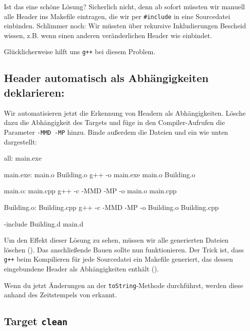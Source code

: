 Ist das eine schöne Lösung?
Sicherlich nicht, denn ab sofort müssten wir manuell alle Header ins Makefile eintragen, die wir per \lstinline{#include} in eine Sourcedatei einbinden.
Schlimmer noch: Wir müssten über rekursive Inkludierungen Bescheid wissen, z.B. wenn  einen anderen veränderlichen Header wie  einbindet.

Glücklicherweise hilft uns \texttt{g++} bei diesem Problem.

\subsection{Header automatisch als Abhängigkeiten deklarieren:}

Wir automatisieren jetzt die Erkennung von Headern als Abhängigkeiten.
Lösche dazu die Abhängigkeit  des Targets  und füge in den Compiler-Aufrufen die Parameter \texttt{-MMD -MP} hinzu.
Binde außerdem die Dateien  und  ein wie unten dargestellt:
\begin{lstmake}
all: main.exe

main.exe: main.o Building.o
    g++ -o main.exe main.o Building.o

main.o: main.cpp
    g++ -c -MMD -MP -o main.o main.cpp

Building.o: Building.cpp
    g++ -c -MMD -MP -o Building.o Building.cpp

-include Building.d main.d
\end{lstmake}

Um den Effekt dieser Lösung zu sehen, müssen wir alle generierten Dateien löschen ().
Das anschließende Bauen sollte nun funktionieren.
Der Trick ist, dass \texttt{g++} beim Kompilieren für jede Sourcedatei ein Makefile generiert, das dessen eingebundene Header als Abhängigkeiten enthält ().

Wenn du jetzt Änderungen an der \lstinline{toString}-Methode durchführst, werden diese anhand des Zeitstempels von  erkannt.

\subsection{Target \lstinline{clean}}

